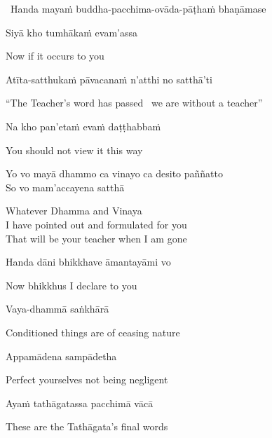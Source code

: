\begin{leader}
  \anglebracketleft\ \hspace{-0.5mm}Handa mayaṁ buddha-pacchima-ovāda-pāṭhaṁ bhaṇāmase \hspace{-0.5mm}\anglebracketright\
\end{leader}

Siyā kho tumhākaṁ evam'assa

\begin{english}
  Now if it occurs to you
\end{english}

Atīta-satthukaṁ pāvacanaṁ n'atthi no satthā'ti

\begin{english-hang}
  ``The Teacher's word has passed \breathmark\ we are without a teacher''
\end{english-hang}

Na kho pan'etaṁ evaṁ daṭṭhabbaṁ

\begin{english}
  You should not view it this way
\end{english}

Yo vo mayā dhammo ca vinayo ca desito paññatto\\
So vo mam'accayena satthā

\begin{english-verses}
  Whatever Dhamma and Vinaya\\
  I have pointed out and formulated for you\\
  That will be your teacher when I am gone
\end{english-verses}

\ifninebythirteen\clearpage\fi

Handa dāni bhikkhave āmantayāmi vo

\begin{english}
  Now bhikkhus I declare to you
\end{english}

Vaya-dhammā saṅkhārā

\begin{english}
  Conditioned things are of ceasing nature\ifdigital\makeatletter\hyperlink{endnote94-appendix}\makeatother\fi
\end{english}

Appamādena sampādetha

\begin{english}
  Perfect yourselves not being negligent
\end{english}

Ayaṁ tathāgatassa pacchimā vācā

\begin{english}
  These are the Tathāgata's final words
\end{english}

\suttaRef{[DN 16]}

\ifbfive
  \cleardoublepage
\fi

\enlargethispage{\baselineskip\vspace{-1.0em}}
\ifdigital{}\fi

